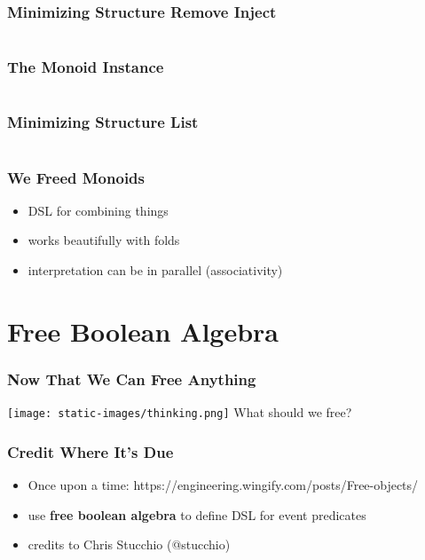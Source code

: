 \documentclass{beamer}
\begin{document}
\begin{frame}
  \frametitle{Minimizing Structure \textemdash{} Remove Inject}
  \inputminted[highlightlines={5}, highlightcolor=yellow!40]{scala}{snippets/free-monoid-4.scala}
\end{frame}

\begin{frame}
  \frametitle{The Monoid Instance}
  \inputminted{scala}{snippets/free-monoid-instance.scala}
\end{frame}

\begin{frame}
  \frametitle{Minimizing Structure \textemdash{} List}
  \inputminted{scala}{snippets/free-monoid-5.scala}
\end{frame}

\begin{frame}
  \frametitle{We Freed Monoids}
  \begin{itemize}
  \item DSL for combining things
  \item works beautifully with folds
  \item interpretation can be in parallel (associativity)
  \end{itemize}
\end{frame}

\section{Free Boolean Algebra}\label{sec:free-boolean-algebra}

\begin{frame}
  \frametitle{Now That We Can Free Anything}
  \begin{center}
    \texttt{[image: static-images/thinking.png]}
    \vfill
    {\Huge What should we free?}
  \end{center}
\end{frame}

\begin{frame}
  \frametitle{Credit Where It's Due}
  \begin{itemize}
  \item Once upon a time:
    https://engineering.wingify.com/posts/Free-objects/
  \item use \textbf{free boolean algebra} to define DSL for event
    predicates
  \item credits to Chris Stucchio (@stucchio)
  \end{itemize}
\end{frame}
\end{document}
